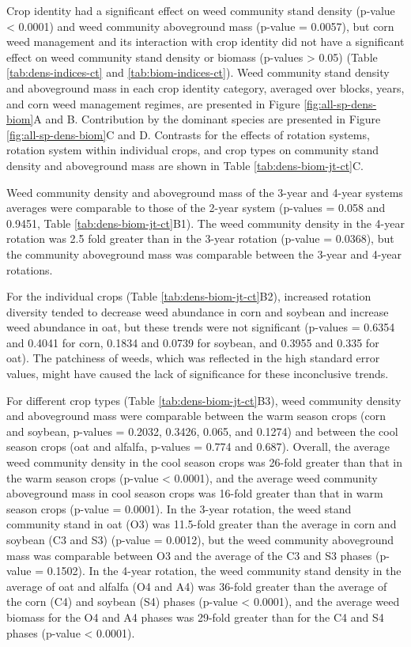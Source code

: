 \documentclass[
]{article}
\begin{document}
Crop identity had a significant effect on weed community stand density (p-value \textless{} 0.0001) and weed community aboveground mass (p-value = 0.0057), but corn weed management and its interaction with crop identity did not have a significant effect on weed community stand density or biomass (p-values \textgreater{} 0.05) (Table \ref{tab:dens-indices-ct} and \ref{tab:biom-indices-ct}). Weed community stand density and aboveground mass in each crop identity category, averaged over blocks, years, and corn weed management regimes, are presented in Figure \ref{fig:all-sp-dens-biom}A and B. Contribution by the dominant species are presented in Figure \ref{fig:all-sp-dens-biom}C and D. Contrasts for the effects of rotation systems, rotation system within individual crops, and crop types on community stand density and aboveground mass are shown in Table \ref{tab:dens-biom-jt-ct}C.

Weed community density and aboveground mass of the 3-year and 4-year systems averages were comparable to those of the 2-year system (p-values = 0.058 and 0.9451, Table \ref{tab:dens-biom-jt-ct}B1). The weed community density in the 4-year rotation was 2.5 fold greater than in the 3-year rotation (p-value = 0.0368), but the community aboveground mass was comparable between the 3-year and 4-year rotations.

For the individual crops (Table \ref{tab:dens-biom-jt-ct}B2), increased rotation diversity tended to decrease weed abundance in corn and soybean and increase weed abundance in oat, but these trends were not significant (p-values = 0.6354 and 0.4041 for corn, 0.1834 and 0.0739 for soybean, and 0.3955 and 0.335 for oat). The patchiness of weeds, which was reflected in the high standard error values, might have caused the lack of significance for these inconclusive trends.

For different crop types (Table \ref{tab:dens-biom-jt-ct}B3), weed community density and aboveground mass were comparable between the warm season crops (corn and soybean, p-values = 0.2032, 0.3426, 0.065, and 0.1274) and between the cool season crops (oat and alfalfa, p-values = 0.774 and 0.687). Overall, the average weed community density in the cool season crops was 26-fold greater than that in the warm season crops (p-value \textless{} 0.0001), and the average weed community aboveground mass in cool season crops was 16-fold greater than that in warm season crops (p-value = 0.0001). In the 3-year rotation, the weed stand community stand in oat (O3) was 11.5-fold greater than the average in corn and soybean (C3 and S3) (p-value = 0.0012), but the weed community aboveground mass was comparable between O3 and the average of the C3 and S3 phases (p-value = 0.1502). In the 4-year rotation, the weed community stand density in the average of oat and alfalfa (O4 and A4) was 36-fold greater than the average of the corn (C4) and soybean (S4) phases (p-value \textless{} 0.0001), and the average weed biomass for the O4 and A4 phases was 29-fold greater than for the C4 and S4 phases (p-value \textless{} 0.0001).
\end{document}
